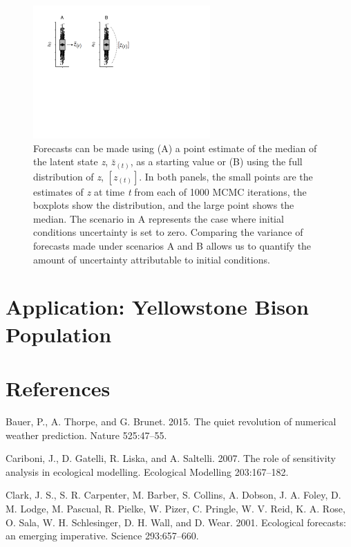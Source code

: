 \documentclass[12pt,]{article}
\begin{document}
\begin{figure}
\centering
\includegraphics[width=\textwidth,height=2in]{../figures/init_cond_example.pdf}
\caption{Forecasts can be made using (A) a point estimate of the median
of the latent state \emph{z}, \(\bar{z}_{(t)}\), as a starting value or
(B) using the full distribution of \emph{z}, \([z_{(t)}]\). In both
panels, the small points are the estimates of \emph{z} at time \emph{t}
from each of 1000 MCMC iterations, the boxplots show the distribution,
and the large point shows the median. The scenario in A represents the
case where initial conditions uncertainty is set to zero. Comparing the
variance of forecasts made under scenarios A and B allows us to quantify
the amount of uncertainty attributable to initial conditions.}
\end{figure}

\hypertarget{application-yellowstone-bison-population}{%
\section{Application: Yellowstone Bison
Population}\label{application-yellowstone-bison-population}}

\hypertarget{references}{%
\section*{References}\label{references}}

\hypertarget{refs}{}
\leavevmode\hypertarget{ref-Bauer2015}{}%
Bauer, P., A. Thorpe, and G. Brunet. 2015. The quiet revolution of
numerical weather prediction. Nature 525:47--55.

\leavevmode\hypertarget{ref-Cariboni2007}{}%
Cariboni, J., D. Gatelli, R. Liska, and A. Saltelli. 2007. The role of
sensitivity analysis in ecological modelling. Ecological Modelling
203:167--182.

\leavevmode\hypertarget{ref-Clark2001}{}%
Clark, J. S., S. R. Carpenter, M. Barber, S. Collins, A. Dobson, J. A.
Foley, D. M. Lodge, M. Pascual, R. Pielke, W. Pizer, C. Pringle, W. V.
Reid, K. A. Rose, O. Sala, W. H. Schlesinger, D. H. Wall, and D. Wear.
2001. Ecological forecasts: an emerging imperative. Science
293:657--660.
\end{document}
